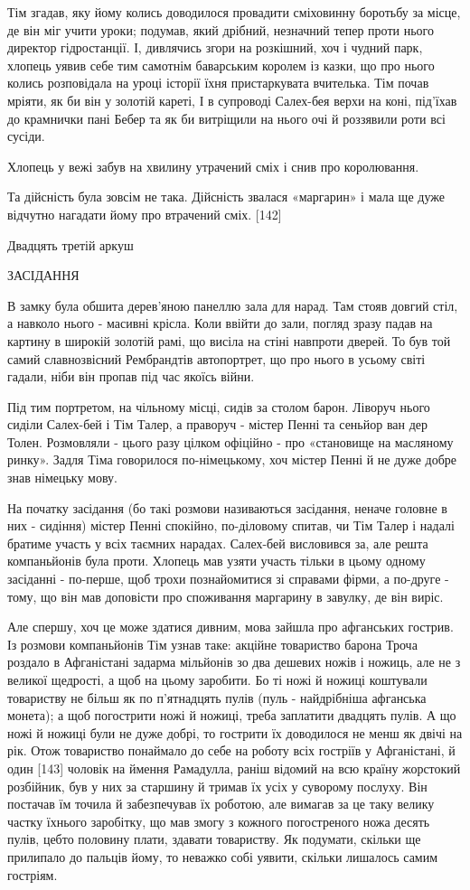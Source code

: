 Тім згадав, яку йому колись доводилося провадити сміховинну боротьбу за місце, де він міг учити уроки; подумав, який дрібний, незначний тепер проти нього директор гідростанції. І, дивлячись згори на розкішний, хоч і чудний парк, хлопець уявив себе тим самотнім баварським королем із казки, що про нього колись розповідала на уроці історії їхня пристаркувата вчителька. Тім почав мріяти, як би він у золотій кареті, І в супроводі Салех-бея верхи на коні, під'їхав до крамнички пані Бебер та як би витріщили на нього очі й роззявили роти всі сусіди.

Хлопець у вежі забув на хвилину утрачений сміх і снив про королювання.

Та дійсність була зовсім не така. Дійсність звалася «маргарин» і мала ще дуже відчутно нагадати йому про втрачений сміх. [142]

Двадцять третій аркуш

ЗАСІДАННЯ

В замку була обшита дерев'яною панеллю зала для нарад. Там стояв довгий стіл, а навколо нього - масивні крісла. Коли ввійти до зали, погляд зразу падав на картину в широкій золотій рамі, що висіла на стіні навпроти дверей. То був той самий славнозвісний Рембрандтів автопортрет, що про нього в усьому світі гадали, ніби він пропав під час якоїсь війни.

Під тим портретом, на чільному місці, сидів за столом барон. Ліворуч нього сиділи Салех-бей і Тім Талер, а праворуч - містер Пенні та сеньйор ван дер Толен. Розмовляли - цього разу цілком офіційно - про «становище на масляному ринку». Задля Тіма говорилося по-німецькому, хоч містер Пенні й не дуже добре знав німецьку мову.

На початку засідання (бо такі розмови називаються засідання, неначе головне в них - сидіння) містер Пенні спокійно, по-діловому спитав, чи Тім Талер і надалі братиме участь у всіх таємних нарадах. Салех-бей висловився за, але решта компаньйонів була проти. Хлопець мав узяти участь тільки в цьому одному засіданні - по-перше, щоб трохи познайомитися зі справами фірми, а по-друге - тому, що він мав доповісти про споживання маргарину в завулку, де він виріс.

Але спершу, хоч це може здатися дивним, мова зайшла про афганських гострив. Із розмови компаньйонів Тім узнав таке: акційне товариство барона Троча роздало в Афганістані задарма мільйонів зо два дешевих ножів і ножиць, але не з великої щедрості, а щоб на цьому заробити. Бо ті ножі й ножиці коштували товариству не більш як по п'ятнадцять пулів (пуль - найдрібніша афганська монета); а щоб погострити ножі й ножиці, треба заплатити двадцять пулів. А що ножі й ножиці були не дуже добрі, то гострити їх доводилося не менш як двічі на рік. Отож товариство понаймало до себе на роботу всіх гостріїв у Афганістані, й один [143] чоловік на ймення Рамадулла, раніш відомий на всю країну жорстокий розбійник, був у них за старшину й тримав їх усіх у суворому послуху. Він постачав їм точила й забезпечував їх роботою, але вимагав за це таку велику частку їхнього заробітку, що мав змогу з кожного погостреного ножа десять пулів, цебто половину плати, здавати товариству. Як подумати, скільки ще прилипало до пальців йому, то неважко собі уявити, скільки лишалось самим гостріям.

